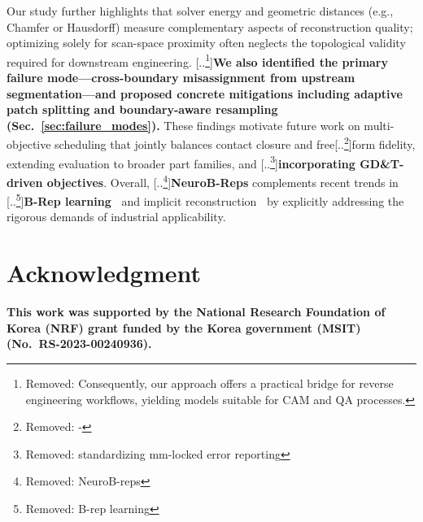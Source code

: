 \documentclass{ieeeaccess}
\providecommand{\DIFaddtex}[1]{{\color{blue}\bfseries #1}} %
\providecommand{\DIFdeltex}[1]{{\color{red}[..\footnote{\color{black}Removed: #1}]}} %
\providecommand{\DIFaddbegin}{} %
\providecommand{\DIFaddend}{} %
\providecommand{\DIFdelbegin}{} %
\providecommand{\DIFdelend}{} %
\providecommand{\DIFadd}[1]{\texorpdfstring{\DIFaddtex{#1}}{#1}} %
\providecommand{\DIFdel}[1]{\texorpdfstring{\DIFdeltex{#1}}{}} %
\begin{document}
Our study further highlights that solver energy and geometric distances (e.g., Chamfer or Hausdorff) measure complementary aspects of reconstruction quality; optimizing solely for scan-space proximity often neglects the topological validity required for downstream engineering. \DIFdelbegin \DIFdel{Consequently, our approach offers a practical bridge for reverse engineering workflows, yielding models suitable for CAM and QA processes.}\DIFdelend \DIFaddbegin \DIFadd{We also identified the primary failure mode---cross-boundary misassignment from upstream segmentation---and proposed concrete mitigations including adaptive patch splitting and boundary-aware resampling (Sec.~\ref{sec:failure_modes}). }\DIFaddend These findings motivate future work on multi-objective scheduling that jointly balances contact closure and free\DIFdelbegin \DIFdel{-}\DIFdelend form fidelity, extending evaluation to broader part families, and \DIFdelbegin \DIFdel{standardizing mm-locked error reporting}\DIFdelend \DIFaddbegin \DIFadd{incorporating GD\&T-driven objectives}\DIFaddend . Overall, \DIFdelbegin \DIFdel{NeuroB-reps }\DIFdelend \DIFaddbegin \DIFadd{NeuroB-Reps }\DIFaddend complements recent trends in \DIFdelbegin \DIFdel{B-rep learning}\DIFdelend \DIFaddbegin \DIFadd{B-Rep learning~}\DIFaddend \cite{b3,b1,b4,b20} and implicit reconstruction\DIFaddbegin \DIFadd{~}\DIFaddend \cite{b5,b6,b17,b21} by explicitly addressing the rigorous demands of industrial applicability.

\DIFdelbegin %
\DIFdelend \DIFaddbegin \section*{\DIFadd{Acknowledgment}}
\DIFadd{This work was supported by the National Research Foundation of Korea (NRF) grant funded by the Korea government (MSIT) (No.\ RS-2023-00240936).
}\DIFaddend 
\end{document}

